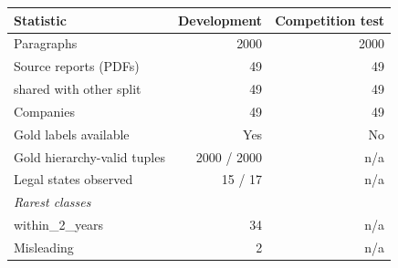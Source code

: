 \begin{tabular}{lrr}
\toprule
Statistic & Development & Competition test \\
\midrule
Paragraphs & 2000 & 2000 \\
Source reports (PDFs) & 49 & 49 \\
\quad shared with other split & 49 & 49 \\
Companies & 49 & 49 \\
Gold labels available & Yes & No \\
Gold hierarchy-valid tuples & 2000 / 2000 & n/a \\
Legal states observed & 15 / 17 & n/a \\
\midrule
\multicolumn{3}{l}{\emph{Rarest classes}} \\
\quad within\_2\_years & 34 & n/a \\
\quad Misleading & 2 & n/a \\
\bottomrule
\end{tabular}
